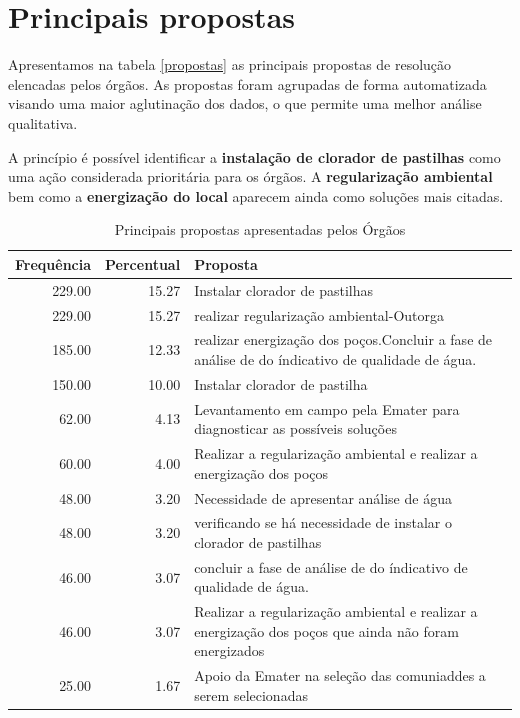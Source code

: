 \documentclass[a4paper, 12pt, openright, oneside, english, brazil, article]{abntex2}
\begin{document}
	
	\section{Principais propostas}
	
	Apresentamos na tabela \ref{propostas} as principais propostas de resolução elencadas pelos órgãos. As propostas foram agrupadas de forma automatizada visando uma maior aglutinação dos dados, o que permite uma melhor análise qualitativa.
	
	A princípio é possível identificar a \textbf{instalação de clorador de pastilhas} como uma ação considerada prioritária para os órgãos. A \textbf{regularização ambiental} bem como a \textbf{energização do local} aparecem ainda como soluções mais citadas.
	
	\begin{scriptsize}
		\begin{longtable}{rrp{11cm}}
			\caption{Principais propostas apresentadas pelos Órgãos} \\ 
			\hline
			Frequência & Percentual & Proposta \\ 
			\hline
			229.00 & 15.27 & Instalar clorador de pastilhas \\ 
			229.00 & 15.27 & realizar regularização ambiental-Outorga \\ 
			185.00 & 12.33 & realizar energização dos poços.Concluir a fase de análise de do índicativo de qualidade de água. \\ 
			150.00 & 10.00 & Instalar clorador de pastilha \\ 
			62.00 & 4.13 & Levantamento em campo pela Emater para diagnosticar as possíveis soluções \\ 
			60.00 & 4.00 & Realizar a regularização ambiental e realizar a energização dos poços \\ 
			48.00 & 3.20 & Necessidade de apresentar análise de água \\ 
			48.00 & 3.20 & verificando se há necessidade de instalar o clorador de pastilhas \\ 
			46.00 & 3.07 & concluir a fase de análise de do índicativo de qualidade de água. \\ 
			46.00 & 3.07 & Realizar a regularização ambiental e realizar a energização dos poços que ainda não foram energizados \\ 
			25.00 & 1.67 & Apoio da Emater na seleção das comuniaddes a serem selecionadas \\ 

\end{longtable}
\end{scriptsize}
\end{document}
